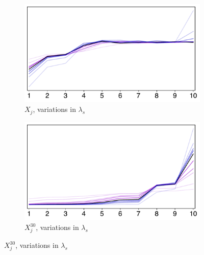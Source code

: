 \documentclass[../main.tex]{subfiles}
\begin{document}
\begin{figure}[H]
    \begin{subfigure}[b]{0.39\linewidth}
        \centering
        \includegraphics[width=\linewidth]{lambda_id1.pdf}
        \vspace{-0.6cm}
        \caption{$X_j$, variations in $\lambda_s$}
        \label{fig:lambda1}
    \end{subfigure}
    \hspace{0.07\linewidth}  %
    \begin{subfigure}[b]{0.39\linewidth}
        \centering
        \includegraphics[width=\linewidth]{lambda_id2.pdf}
        \vspace{-0.6cm}
        \caption{$X_j^{30}$, variations in $\lambda_s$}
        \label{fig:lambda2}
    \end{subfigure}

    \vspace{0.3cm}


\end{figure}
\end{document}
